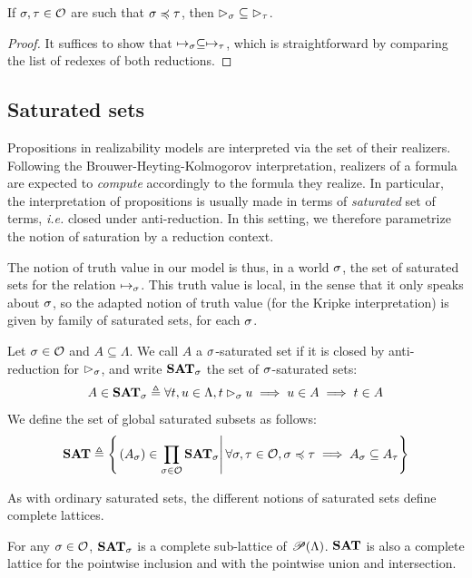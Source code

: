 \documentclass[a4paper,UKenglish,cleveref, autoref, thm-restate]{lipics-v2021}
\begin{document}
\begin{proposition}
  If $\sigma, \tau \in \mathcal O$ are such that $\sigma \preccurlyeq \tau$, then $\rhd_{\sigma} \subseteq \rhd_{\tau}$.
\end{proposition}

\begin{proof}
  It suffices to show that $\mapsto_{\sigma}\subseteq \mapsto_{\tau}$, which is straightforward by comparing the list of redexes of both reductions.
\end{proof}

\subsection{Saturated sets}

Propositions in realizability models are interpreted via the set of their realizers. Following the Brouwer-Heyting-Kolmogorov interpretation, realizers of a formula are expected to \emph{compute} accordingly to the formula they realize. In particular, the interpretation of propositions is usually made in terms of \emph{saturated} set of terms, \emph{i.e.} closed under anti-reduction.
In this setting, we therefore parametrize the notion of saturation by a reduction context.

The notion of truth value in our model is thus, in a world $\sigma$, the set of saturated sets for the relation $\mapsto_{\sigma}$. This truth value is local, in the sense that it only speaks about $\sigma$, so the adapted notion of truth value (for the Kripke interpretation) is given by family of saturated sets, for each $\sigma$.

\begin{definition}
  Let $\sigma\in\mathcal O$ and $A \subseteq \Lambda$.
  We call $A$ a $\sigma$-saturated set if it is closed by anti-reduction for $\rhd_{\sigma}$, and write ${\mathbf{SAT}}_{\sigma}$ the set of $\sigma$-saturated sets:
  \[A \in {\mathbf{SAT}}_{\sigma} \triangleq \forall t,u \in \Lambda, t \rhd_{\sigma} u \implies u \in A \implies t \in A\]
  We define the set of global saturated subsets as follows:
  \[{\mathbf{SAT}} \triangleq \left\{\left.(A_{\sigma}) \in \prod_{\sigma\in\mathcal O} {\mathbf{SAT}}_{\sigma} \right\vert
  \forall \sigma,\tau\in\mathcal O, \sigma \preccurlyeq \tau \implies A_{\sigma} \subseteq A_{\tau}\right\}\]
\end{definition}

As with ordinary saturated sets, the different notions of saturated sets define complete lattices.

\begin{proposition}
  For any $\sigma \in \mathcal O$, ${\mathbf{SAT}}_{\sigma}$ is a complete sub-lattice of $\mathscr{P}(\Lambda)$. ${\mathbf{SAT}}$ is also a complete lattice for the pointwise inclusion and with the pointwise union and intersection.
\end{proposition}
\end{document}
